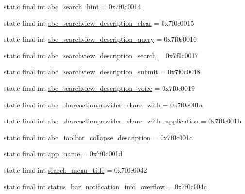 \begin{DoxyCompactItemize}
\item 
static final int \mbox{\hyperlink{classcom_1_1synnapps_1_1carouselview_1_1_r_1_1string_a04d8e030e5b574c83fd07ebf5b49003e}{abc\+\_\+search\+\_\+hint}} = 0x7f0c0014
\item 
static final int \mbox{\hyperlink{classcom_1_1synnapps_1_1carouselview_1_1_r_1_1string_a897d92a96e5495f1fc09e3901364171f}{abc\+\_\+searchview\+\_\+description\+\_\+clear}} = 0x7f0c0015
\item 
static final int \mbox{\hyperlink{classcom_1_1synnapps_1_1carouselview_1_1_r_1_1string_a79199e0f161130d7f62ebabfa5ad932a}{abc\+\_\+searchview\+\_\+description\+\_\+query}} = 0x7f0c0016
\item 
static final int \mbox{\hyperlink{classcom_1_1synnapps_1_1carouselview_1_1_r_1_1string_a532069816a9226dd6ffd567751aed815}{abc\+\_\+searchview\+\_\+description\+\_\+search}} = 0x7f0c0017
\item 
static final int \mbox{\hyperlink{classcom_1_1synnapps_1_1carouselview_1_1_r_1_1string_a7d5ec76a7bf79f36720ef663da430212}{abc\+\_\+searchview\+\_\+description\+\_\+submit}} = 0x7f0c0018
\item 
static final int \mbox{\hyperlink{classcom_1_1synnapps_1_1carouselview_1_1_r_1_1string_a4890314ee3cd94eb17cb5907b0c73732}{abc\+\_\+searchview\+\_\+description\+\_\+voice}} = 0x7f0c0019
\item 
static final int \mbox{\hyperlink{classcom_1_1synnapps_1_1carouselview_1_1_r_1_1string_a722343905e31e914c4bcf02ea3b2eb90}{abc\+\_\+shareactionprovider\+\_\+share\+\_\+with}} = 0x7f0c001a
\item 
static final int \mbox{\hyperlink{classcom_1_1synnapps_1_1carouselview_1_1_r_1_1string_acfa944f1d94d52b18c70e3c129c6ec92}{abc\+\_\+shareactionprovider\+\_\+share\+\_\+with\+\_\+application}} = 0x7f0c001b
\item 
static final int \mbox{\hyperlink{classcom_1_1synnapps_1_1carouselview_1_1_r_1_1string_a6720e9cad7b1b17b590053baf178ac68}{abc\+\_\+toolbar\+\_\+collapse\+\_\+description}} = 0x7f0c001c
\item 
static final int \mbox{\hyperlink{classcom_1_1synnapps_1_1carouselview_1_1_r_1_1string_a60e3d6b735127e1bf3b745b46a7e8280}{app\+\_\+name}} = 0x7f0c001d
\item 
static final int \mbox{\hyperlink{classcom_1_1synnapps_1_1carouselview_1_1_r_1_1string_aa07365ee46aa22470dbeb04b466cb25f}{search\+\_\+menu\+\_\+title}} = 0x7f0c0042
\item 
static final int \mbox{\hyperlink{classcom_1_1synnapps_1_1carouselview_1_1_r_1_1string_ad6cc2b4f545e49faec2778f35174e913}{status\+\_\+bar\+\_\+notification\+\_\+info\+\_\+overflow}} = 0x7f0c004c
\end{DoxyCompactItemize}
